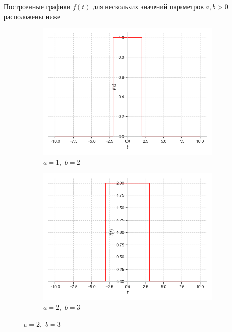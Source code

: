 \documentclass[a4paper, 16pt]{article}
\begin{document}
    \newpage
    \noindent Построенные графики $f(t)$ для нескольких значений параметров $a,b>0$ расположены ниже
    \begin{figure}[htbp]
        \centering
        \begin{subfigure}{0.3\textwidth}
            \centering
            \includegraphics[width=\linewidth]{rectf_a=1_b=2.png}
            \caption{$a=1,\,\,b=2$}
            \label{fig:rectf_1}
        \end{subfigure}
        \hfill
        \begin{subfigure}{0.3\textwidth}
            \centering
            \includegraphics[width=\linewidth]{rectf_a=2_b=3.png}
            \caption{$a=2,\,\,b=3$}
            \label{fig:rectf_2}

\end{subfigure}
\end{figure}
\end{document}
